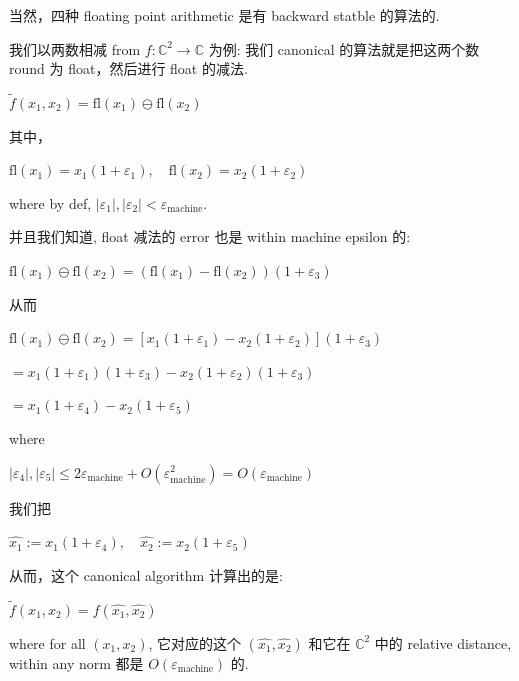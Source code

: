 \begin{example}

当然，四种 floating point arithmetic 是有 backward statble 的算法的.

我们以两数相减 from \(f:\mathbb{C}^{2}\rightarrow\mathbb{C}\) 为例: 我们 canonical 的算法就是把这两个数 round 为 float，然后进行 float 的减法.

\(\widetilde{f}\left( {x_{1},x_{2}} \right) = \text{fl}\left( x_{1} \right) \ominus \text{fl}\left( x_{2} \right)\)

其中，

\(\text{fl}\left( x_{1} \right) = x_{1}\left( {1 + \varepsilon_{1}} \right),\quad\text{fl}\left( x_{2} \right) = x_{2}\left( {1 + \varepsilon_{2}} \right)\)

where by def, \(\left| \varepsilon_{1} \right|,\left| \varepsilon_{2} \right| < \varepsilon_{\text{machine}}\).

并且我们知道, float 减法的 error 也是 within machine epsilon 的:

\(\text{fl}\left( x_{1} \right) \ominus \text{fl}\left( x_{2} \right) = \left( {\text{fl}\left( x_{1} \right) - \text{fl}\left( x_{2} \right)} \right)\left( {1 + \varepsilon_{3}} \right)\)

从而

\(\text{fl}\left( x_{1} \right) \ominus \text{fl}\left( x_{2} \right) = \left\lbrack {x_{1}\left( {1 + \varepsilon_{1}} \right) - x_{2}\left( {1 + \varepsilon_{2}} \right)} \right\rbrack\left( {1 + \varepsilon_{3}} \right)\)

\(= x_{1}\left( {1 + \varepsilon_{1}} \right)\left( {1 + \varepsilon_{3}} \right) - x_{2}\left( {1 + \varepsilon_{2}} \right)\left( {1 + \varepsilon_{3}} \right)\)

\(= x_{1}\left( {1 + \varepsilon_{4}} \right) - x_{2}\left( {1 + \varepsilon_{5}} \right)\)

where

\(\left| \varepsilon_{4} \right|,\left| \varepsilon_{5} \right| \leq 2\varepsilon_{\text{machine}} + O\left( \varepsilon_{\text{machine}}^{2} \right) = O\left( \varepsilon_{\text{machine}} \right)\)

我们把

\(\widehat{x_{1}} := x_{1}\left( {1 + \varepsilon_{4}} \right),\quad\widehat{x_{2}} := x_{2}\left( {1 + \varepsilon_{5}} \right)\)

从而，这个 canonical algorithm 计算出的是:

\(\widetilde{f}\left( {x_{1},x_{2}} \right) = f\left( {\widehat{x_{1}},\widehat{x_{2}}} \right)\)

where for all \(\left( {x_{1},x_{2}} \right)\), 它对应的这个 \(\left( {\widehat{x_{1}},\widehat{x_{2}}} \right)\) 和它在 \(\mathbb{C}^{2}\) 中的 relative distance, within any norm 都是 \(O\left( \varepsilon_{\text{machine}} \right)\) 的.

\end{example}

